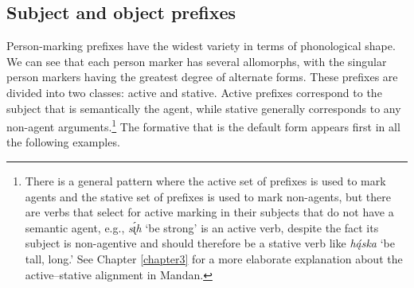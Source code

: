 \largerpage
\subsection{Subject and object prefixes}\label{CHSk3.1}
Person-marking prefixes have the widest variety in terms of phonological shape. We can see that each person marker has several allomorphs, with the singular person markers having the greatest degree of alternate forms. These prefixes are divided into two classes: active and stative. Active prefixes correspond to the subject that is semantically the agent, while stative generally corresponds to any non-agent arguments.\footnote{There is a general pattern where the active set of prefixes is used to mark agents and the stative set of prefixes is used to mark non-agents, but there are verbs that select for active marking in their subjects that do not have a semantic agent, e.g., \textit{s\'{ı̨}h} `be strong' is an active verb, despite the fact its subject is non-agentive and should therefore be a stative verb like \textit{hą́ska} `be tall, long.' See Chapter \ref{chapter3} for a more elaborate explanation about the active--stative alignment in Mandan.} The formative that is the default form appears first in all the following examples.

